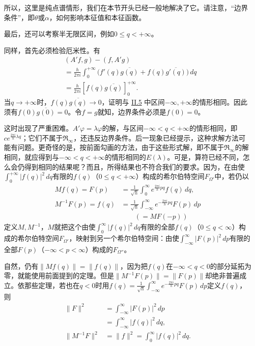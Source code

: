 \documentclass[fontsize=13pt,twoside,openany,headings=normal,parskip=false,bookmarkpackage=false,DIV=calc]{scrbook}
\begin{document}
所以，这里是纯点谱情形，我们在本节开头已经一般地解决了它。请注意，“边界条件”，即$\theta$或$\alpha$，如何影响本征值和本征函数。

最后，还可以考察半无限区间，例如$0\leq q<+\infty$。

\hypertarget{origpage-72}{}\label{origpage-72}同样，首先必须检验厄米性。有
\begin{align*}
&(A'f,g)-(f,A'g)\\
&=\frac{h}{2\pi i}\int_0^{+\infty}\bigl(f'(q)\overline{g(q)}+f(q)\overline{g'(q)}\bigr)\,dq\\
&=\frac{h}{2\pi i}[f(q)\overline{g(q)}]_0^{+\infty}.
\end{align*}
当$q\to+\infty$时，$f(q)\overline{g(q)}\to0$，证明与 \hyperref[sec:II.5]{II.5} 中区间$-\infty,\allowbreak +\infty$的情形相同。因此须有$f(0)\overline{g(0)}=0$。令$f=g$就知，边界条件必须是$f(0)=0$。

这时出现了严重困难。$A'\varphi=\lambda\varphi$的解，与区间$-\infty<q<+\infty$的情形相同，即$ce^{\frac{2\pi i}{h}\lambda q}$；它们不属于$\mathfrak{R}_\infty$，还违反边界条件。后一现象已经提示，这种求解方法可能有问题。更奇怪的是，按前面勾画的方法，由于这些形式解，即不属于$\mathfrak{R}_\infty$的解相同，就应得到与$-\infty<q<+\infty$的情形相同的$E(\lambda)$。可是，算符已经不同，怎么会仍得到相同的结果呢？而且，所得结果也不符合我们的要求。因为，在由使$\int_0^{+\infty}|f(q)|^2\,dq$有限的$f(q)$（$0\leq q<+\infty$）构成的希尔伯特空间$F_{\Omega'}$中，若仍以
\begin{align*}
Mf(q)=F(p)&=\frac1{\sqrt h}\int_0^{\infty}e^{\frac{2\pi i}{h}pq}f(q)\,dq,\\
M^{-1}F(p)=f(q)&=\frac1{\sqrt h}\int_{-\infty}^{\infty}e^{-\frac{2\pi i}{h}pq}F(p)\,dp
\\
&\qquad(=MF(-p))
\end{align*}
定义$M,\allowbreak M^{-1}$，$M$就把这个由使$\int_0^{\infty}|f(q)|^2\,dq$有限的全部$f(q)$（$0\leq q<\infty$）构成的希尔伯特空间$F_{\Omega'}$，映射到另一个希尔伯特空间：由使$\int_{-\infty}^{\infty}|F(p)|^2\,dp$有限的全部$F(p)$（$-\infty<p<\infty$）构成的$F_{\Omega''}$。

自然，仍有$\|Mf(q)\|=\|f(q)\|$，因为把$f(q)$在$-\infty<q<0$的部分延拓为零，就能使用前面提到的定理。但是$\|M^{-1}F(p)\|=\|F(p)\|$却绝非普遍成立。依那些定理，若也在$q<0$时用$f(q)=\frac1{\sqrt h}\int_{-\infty}^{\infty}e^{-\frac{2\pi i}{h}pq}F(p)\,dp$定义$f(q)$，则
\begin{align*}
\|F\|^2&=\int_{-\infty}^{\infty}|F(p)|^2\,dp\\
&=\int_{-\infty}^{\infty}|f(q)|^2\,dq,\\
\|M^{-1}F\|^2&=\|f\|^2=\int_0^{\infty}|f(q)|^2\,dq.
\end{align*}
\end{document}
